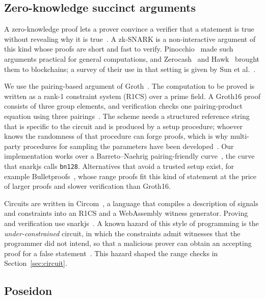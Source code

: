 \subsection{Zero-knowledge succinct arguments}

A zero-knowledge proof lets a prover convince a verifier that a statement is
true without revealing why it is true~\cite{goldwasser1989}. A zk-SNARK is a
non-interactive argument of this kind whose proofs are short and fast to
verify. Pinocchio~\cite{parno2013pinocchio} made such arguments practical for
general computations, and Zerocash~\cite{bensasson2014zerocash} and
Hawk~\cite{kosba2016hawk} brought them to blockchains; a survey of their use
in that setting is given by Sun et al.~\cite{sun2021zkpsurvey}.

We use the pairing-based argument of Groth~\cite{groth2016}. The computation
to be proved is written as a rank-1 constraint system (R1CS) over a prime
field. A Groth16 proof consists of three group elements, and verification
checks one pairing-product equation using three pairings~\cite{groth2016}.
The scheme needs a structured reference string that is specific to the
circuit and is produced by a setup procedure; whoever knows the randomness of
that procedure can forge proofs, which is why multi-party procedures for
sampling the parameters have been developed~\cite{bensasson2015sampling}.
Our implementation works over a Barreto--Naehrig pairing-friendly
curve~\cite{barreto2006bn}, the curve that snarkjs calls \texttt{bn128}.
Alternatives that avoid a trusted setup exist, for example
Bulletproofs~\cite{bunz2018bulletproofs}, whose range proofs fit this
kind of statement at the price of larger proofs and slower verification
than Groth16.

Circuits are written in Circom~\cite{belles2023circom}, a language that
compiles a description of signals and constraints into an R1CS and a
WebAssembly witness generator. Proving and verification use
snarkjs~\cite{snarkjs}. A known hazard of this style of programming is the
\emph{under-constrained} circuit, in which the constraints admit witnesses
that the programmer did not intend, so that a malicious prover can obtain an
accepting proof for a false statement~\cite{pailoor2023underconstrained}.
This hazard shaped the range checks in Section~\ref{sec:circuit}.

\subsection{Poseidon}

